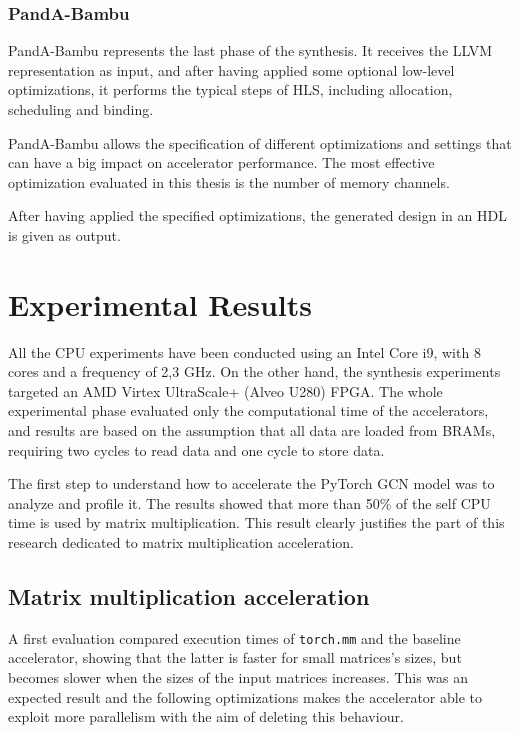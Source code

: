 \documentclass[11pt,a4paper,twocolumn]{article}
\begin{document}
\subsubsection*{PandA-Bambu}
\label{subsec:bambu}%

PandA-Bambu represents the last phase of the synthesis.
It receives the LLVM representation as input, and after having applied some optional low-level optimizations, it performs the typical steps of HLS, including allocation, scheduling and binding.

PandA-Bambu allows the specification of different optimizations and settings that can have a big impact on accelerator performance.
The most effective optimization evaluated in this thesis is the number of memory channels.

After having applied the specified optimizations, the generated design in an HDL is given as output.


\section{Experimental Results}
\label{sec:experimental-results}%

All the CPU experiments have been conducted using an Intel Core i9, with 8 cores and a frequency of 2,3 GHz.
On the other hand, the synthesis experiments targeted an AMD Virtex UltraScale+ (Alveo U280) FPGA\@.
The whole experimental phase evaluated only the computational time of the accelerators, and results are based on the assumption that all data are loaded from BRAMs, requiring two cycles to read data and one cycle to store data.

The first step to understand how to accelerate the PyTorch GCN model was to analyze and profile it.
The results showed that more than 50\% of the self CPU time is used by matrix multiplication.
This result clearly justifies the part of this research dedicated to matrix multiplication acceleration.

\subsection{Matrix multiplication acceleration}
\label{subsec:matmul}%

A first evaluation compared execution times of \lstinline{torch.mm} and the baseline accelerator, showing that the latter is faster for small matrices's sizes, but becomes slower when the sizes of the input matrices increases.
This was an expected result and the following optimizations makes the accelerator able to exploit more parallelism with the aim of deleting this behaviour.
\end{document}
